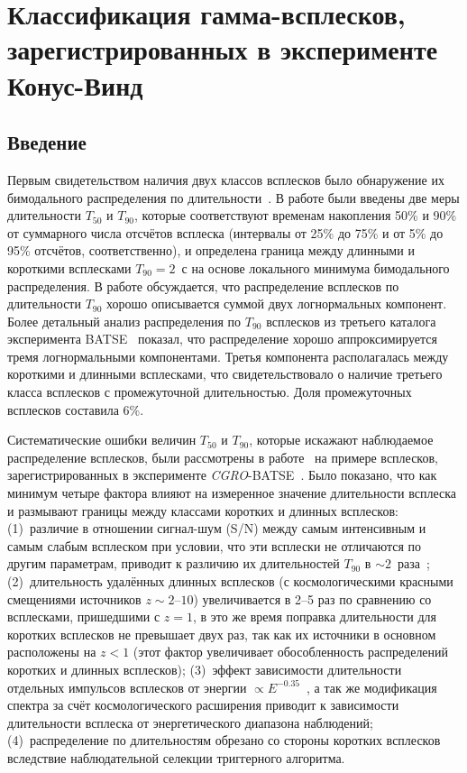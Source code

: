 \chapter{Классификация гамма-всплесков, зарегистрированных в эксперименте Конус-Винд}\label{KW_GRB_classification}

\section{Введение}
Первым свидетельством наличия двух классов всплесков было обнаружение их бимодального 
распределения по длительности~\citep{Mazets_1981_part_1,Norris_1984,Kouveliotou_1993,Aptekar_1998}. 
В работе \citep{Kouveliotou_1993} были введены две меры длительности $T_{50}$ и $T_{90}$, 
которые соответствуют временам накопления 50\% и 90\% от суммарного числа отсчётов 
всплеска (интервалы от 25\% до 75\% и от 5\% до 95\% отсчётов, соответственно), 
и определена граница между длинными и короткими всплесками $T_{90}=2$~с 
на основе локального минимума бимодального распределения. 
В работе \citep{McBreen_1994} обсуждается, что распределение всплесков по 
длительности $T_{90}$ хорошо описывается суммой двух логнормальных компонент. 
Более детальный анализ распределения по $T_{90}$ всплесков из третьего каталога 
эксперимента BATSE~\citep{Horvath_2002} показал, что распределение 
хорошо аппроксимируется тремя логнормальными компонентами. 
Третья компонента располагалась между короткими и длинными всплесками, 
что свидетельствовало о наличие третьего класса всплесков с промежуточной длительностью.
Доля промежуточных всплесков составила 6\%. 

Систематические ошибки величин $T_{50}$ и $T_{90}$, которые искажают наблюдаемое 
распределение всплесков, были рассмотрены в работе~\citep{Norris_and_Bonnel_2006ApJ} 
на примере всплесков, зарегистрированных в эксперименте \textit{CGRO}-BATSE~\citep{Fishman_1992NASCP3137}. 
Было показано, что как минимум четыре фактора влияют на измеренное значение длительности 
всплеска и размывают границы между классами коротких и длинных всплесков: 
(1)~различие в отношении сигнал-шум (S/N) между самым интенсивным и самым слабым 
всплеском  при условии, что эти всплески не отличаются по другим параметрам, 
приводит к различию их длительностей $T_{90}$ в $\sim 2$~раза~\citep{Bonnell_1997}; 
(2)~длительность удалённых длинных всплесков (с космологическими красными смещениями источников 
$z \sim 2 \textrm{--}10$) увеличивается в 2--5 раз по сравнению со всплесками, 
пришедшими с $z=1$, в это же время поправка длительности 
для коротких всплесков не превышает двух раз, так как их источники в основном 
расположены на $z<1$ (этот фактор увеличивает обособленность распределений 
коротких и длинных всплесков); (3)~эффект зависимости длительности отдельных импульсов 
всплесков от энергии $\propto E^{-0.35}$~\citep{Fenimore_1995}, а так же модификация 
спектра за счёт космологического расширения приводит к зависимости длительности 
всплеска от энергетического диапазона наблюдений; (4)~распределение по длительностям 
обрезано со стороны коротких всплесков вследствие наблюдательной селекции триггерного 
алгоритма. 

